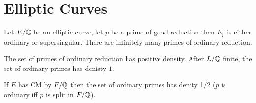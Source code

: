 \documentclass[12pt]{article}
\begin{document}
\section{Elliptic Curves}

Let $E / \mathbb{Q}$ be an elliptic curve, let $p$ be a prime of good reduction then $E_p$ is either ordinary or supersingular. There are infinitely many primes of ordinary reduction.

\begin{theorem}[Serre]
The set of primes of ordinary reduction has positive density. After $L / \mathbb{Q}$ finite, the set of ordinary primes has denisty $1$.
\end{theorem}

\begin{theorem}
If $E$ has CM by $F / \mathbb{Q}$ then the set of ordinary primes has denity 1/2 ($p$ is ordinary iff $p$ is split in $F / \mathbb{Q}$). 
\end{theorem}
\end{document}
